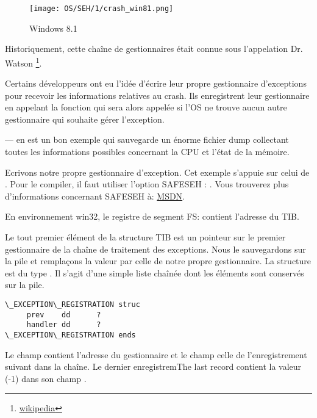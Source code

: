 \begin{figure}[H]
\centering
\texttt{[image: OS/SEH/1/crash\_win81.png]}
\caption{Windows 8.1}
\end{figure}

Historiquement, cette chaîne de gestionnaires était connue sous l'appelation Dr. Watson
\footnote{\href{http://go.yurichev.com/17046}{wikipedia}}.

Certains développeurs ont eu l'idée d'écrire leur propre gestionnaire d'exceptions pour recevoir 
les informations relatives au crash.
Ils enregistrent leur gestionnaire en appelant la fonction  qui 
sera alors appelée si l'\ac{OS} ne trouve aucun autre gestionnaire qui souhaite gérer l'exception.

\myindex{\oracle}
\oracle--- en est un bon exemple qui sauvegarde un énorme fichier dump collectant toutes les 
informations possibles concernant la \ac{CPU} et l'état de la mémoire.

Ecrivons notre propre gestionnaire d'exception. Cet exemple s'appuie sur celui de \PietrekSEH.
Pour le compiler, il faut utiliser l'option SAFESEH : .
Vous trouverez plus d'informations concernant SAFESEH à: \href{http://go.yurichev.com/17252}{MSDN}.



En environnement win32, le registre de segment FS: contient l'adresse du \ac{TIB}.

Le tout premier élément de la structure \ac{TIB} est un pointeur sur le premier gestionnaire de la 
chaîne de traitement des exceptions.
Nous le sauvegardons sur la pile et remplaçons la valeur par celle de notre propre gestionnaire.
La structure est du type . Il s'agit d'une simple liste chaînée dont 
les éléments sont conservés sur la pile.

\begin{lstlisting}[caption=MSVC/VC/crt/src/exsup.inc,style=customasmx86]
\_EXCEPTION\_REGISTRATION struc
     prev    dd      ?
     handler dd      ?
\_EXCEPTION\_REGISTRATION ends
\end{lstlisting}

Le champ  contient l'adresse du gestionnaire et le champ  celle de 
l'enregistrement suivant dans la chaîne.
Le dernier enregistremThe last record contient la valeur  (-1) dans son champ .

